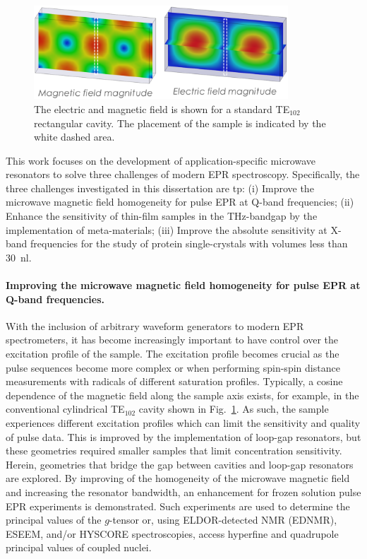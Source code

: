 \begin{figure}[ht]
 \centering
 \includegraphics[width=0.85\textwidth]{Kapitel/Ch1-images/Cavity.eps}
 \caption[Standard TE$_{102}$ Caivty.]{The electric and magnetic field is shown for a standard TE$_{102}$ rectangular cavity. The placement of the sample is indicated by the white dashed area.}
 \label{fig:cavity}
\end{figure}

This work focuses on the development of application-specific microwave resonators to solve three challenges of modern EPR spectroscopy. Specifically, the three challenges investigated in this dissertation are tp: (i) Improve the microwave magnetic field homogeneity for pulse EPR at Q-band frequencies; (ii) Enhance the sensitivity of thin-film samples in the THz-bandgap by the implementation of meta-materials; (iii) Improve the absolute sensitivity at X-band frequencies for the study of protein single-crystals with volumes less than 30~nl.

\hspace{1em}
\paragraph*{Improving the microwave magnetic field homogeneity for pulse EPR at Q-band frequencies.}
With the inclusion of arbitrary waveform generators to modern EPR spectrometers, it has become increasingly important to have control over the excitation profile of the sample. \cite{DOLL201418,WILI201826} The excitation profile becomes crucial as the pulse sequences become more complex \cite{MILIKISYANTS200948,C7CP01488K,C6CP03067J,BREITGOFF2019106560} or when performing spin-spin distance measurements with radicals of different saturation profiles. \cite{C8CP01276H} Typically, a cosine dependence of the magnetic field along the sample axis exists, for example, in the conventional cylindrical TE$_{\text{102}}$ cavity shown in Fig.~\ref{fig:cavity}. As such, the sample experiences different excitation profiles which can limit the sensitivity and quality of pulse data. This is improved by the implementation of loop-gap resonators, but these geometries required smaller samples that limit concentration sensitivity. Herein, geometries that bridge the gap between cavities and loop-gap resonators are explored. By improving of the homogeneity of the microwave magnetic field\cite{HydeUFRev2019} and increasing the resonator bandwidth, an enhancement for frozen solution pulse EPR experiments is demonstrated. Such experiments are used to determine the principal values of the $g$-tensor or, using ELDOR-detected NMR (EDNMR), ESEEM, and/or HYSCORE spectroscopies, access hyperfine and quadrupole principal values of coupled nuclei. \cite{Harmer2009}

